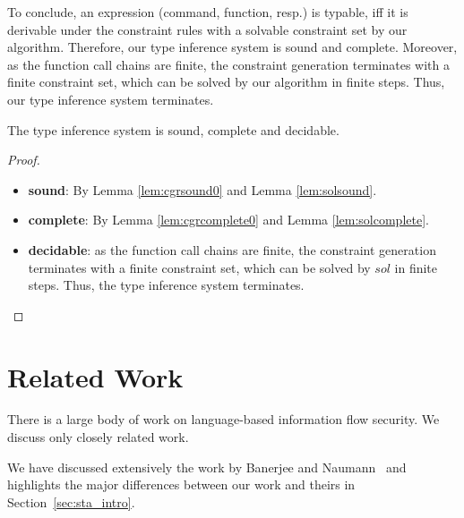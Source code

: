 {{{To conclude, an expression (command, function, resp.) is typable, iff it is derivable under the constraint rules with a solvable constraint set by our algorithm.
Therefore, our type inference system is sound and complete.
Moreover, as the function call chains are finite, the constraint generation terminates with a finite constraint set, which can be solved by our algorithm in finite steps.
Thus, our type inference system terminates.

\begin{theorem}
The type inference system is sound, complete and decidable.
\end{theorem}
\begin{proof}
\begin{itemize}
\item \textbf{sound}: By Lemma  \ref{lem:cgrsound0} and Lemma \ref{lem:solsound}.
\item \textbf{complete}: By Lemma  \ref{lem:cgrcomplete0} and Lemma \ref{lem:solcomplete}.
\item \textbf{decidable}: as the function call chains are finite, the constraint generation terminates with a finite constraint set, which can be solved by $sol$ in finite steps. Thus, the type inference system terminates.
\end{itemize}
\end{proof}


\section{Related Work}

There is a large body of work on language-based information flow security. We discuss only closely related work.

We have discussed extensively the work by Banerjee and Naumann~\cite{Banerjee:2005ht} and highlights the major differences between our work and theirs in Section~\ref{sec:sta_intro}.


}}}
